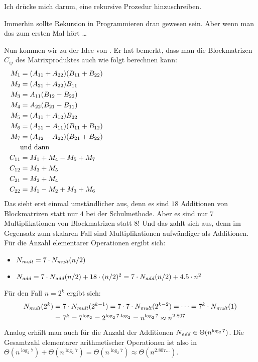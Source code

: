 \begin{tutorium}
  Ich drücke mich darum, eine rekursive Prozedur hinzuschreiben.

  Immerhin sollte Rekursion in Programmieren dran gewesen sein. Aber wenn
  man das zum ersten Mal hört \dots
\end{tutorium}
%
Nun kommen wir zu der Idee von
\textcite{Strassen_1969_GEO_ar}. Er hat
bemerkt, dass man die Blockmatrizen $C_{ij}$ des Matrixproduktes auch
wie folgt berechnen kann:
\begin{align*}
  M_{1} &=  (A_{11} + A_{22}) (B_{11} + B_{22}) \\
  M_{2} &=  (A_{21} + A_{22}) B_{11} \\
  M_{3} &=  A_{11} (B_{12} - B_{22}) \\
  M_{4} &=  A_{22} (B_{21} - B_{11}) \\
  M_{5} &=  (A_{11} + A_{12}) B_{22} \\
  M_{6} &=  (A_{21} - A_{11}) (B_{11} + B_{12}) \\
  M_{7} &=  (A_{12} - A_{22}) (B_{21} + B_{22}) \\
\noalign{und dann}
  C_{11} &= M_{1} + M_{4} - M_{5} + M_{7} \\
  C_{12} &= M_{3} + M_{5} \\
  C_{21} &= M_{2} + M_{4} \\
  C_{22} &= M_{1} - M_{2} + M_{3} + M_{6}
\end{align*}
%
Das sieht erst einmal umständlicher aus, denn es sind $18$ Additionen
von Blockmatrizen statt nur $4$ bei der Schulmethode.  Aber es sind
nur $7$ Multiplikationen von Blockmatrizen statt $8$! Und das zahlt
sich aus, denn im Gegensatz zum skalaren Fall sind Multiplikationen
aufwändiger als Additionen. Für die Anzahl elementarer Operationen
ergibt sich:
\begin{itemize}
\item $N_{\mathit{mult}} = 7 \cdot N_{\mathit{mult}}(n/2)$
\item $N_{\mathit{add}} = 7 \cdot N_{\mathit{add}}(n/2) + 18\cdot (n/2)^2 = 7
  \cdot N_{\mathit{add}}(n/2) + 4.5\cdot n^2 $
\end{itemize}
%
Für den Fall $n=2^k$ ergibt sich:
%
\begin{align*}
  N_{\mathit{mult}}(2^k) &= 7 \cdot N_{\mathit{mult}}(2^{k-1}) = 7 \cdot 7 \cdot N_{\mathit{mult}}(2^{k-2}) = \cdots = 7^k \cdot N_{\mathit{mult}}(1) \\
  &= 7^k = 7^{\log_2} = 2^{\log_2 7 \cdot \log_2} = n^{\log_2 7} \approx n^{2.807\dots}
\end{align*}
%
Analog erhält man auch für die Anzahl der Additionen $N_{\mathit{add}}
\in\Theta(n^{\log_2 7})$.  Die Gesamtzahl elementarer arithmetischer
Operationen ist also in $\Theta(n^{\log_2 7})+\Theta(n^{\log_2 7})=
\Theta(n^{\log_2 7})\approx\Theta(n^{2.807\dots})$.

